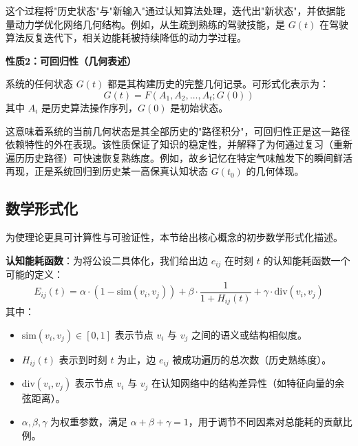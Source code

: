 \documentclass[12pt,a4paper]{article}
\begin{document}
这个过程将"历史状态"与"新输入"通过认知算法处理，迭代出"新状态"，并依据能量动力学优化网络几何结构。例如，从生疏到熟练的驾驶技能，是 $G(t)$ 在驾驶算法反复迭代下，相关边能耗被持续降低的动力学过程。

\textbf{性质2：可回归性（几何表述）}

系统的任何状态 $G(t)$ 都是其构建历史的完整几何记录。可形式化表示为：
\begin{equation}
G(t) = F(A_1, A_2, \ldots, A_t; G(0))
\end{equation}
其中 $A_i$ 是历史算法操作序列，$G(0)$ 是初始状态。

这意味着系统的当前几何状态是其全部历史的"路径积分"，可回归性正是这一路径依赖特性的外在表现。该性质保证了知识的稳定性，并解释了为何通过复习（重新遍历历史路径）可快速恢复熟练度。例如，故乡记忆在特定气味触发下的瞬间鲜活再现，正是系统回归到历史某一高保真认知状态 $G(t_0)$ 的几何体现。

\subsection{数学形式化}
为使理论更具可计算性与可验证性，本节给出核心概念的初步数学形式化描述。

\textbf{认知能耗函数}：为将公设二具体化，我们给出边 $e_{ij}$ 在时刻 $t$ 的认知能耗函数一个可能的定义：
\begin{equation}
E_{ij}(t) = \alpha \cdot (1 - \text{sim}(v_i, v_j)) + \beta \cdot \frac{1}{1 + H_{ij}(t)} + \gamma \cdot \text{div}(v_i, v_j)
\label{eq:energy_function}
\end{equation}
其中：
\begin{itemize}
    \item $\text{sim}(v_i, v_j) \in [0, 1]$ 表示节点 $v_i$ 与 $v_j$ 之间的语义或结构相似度。
    \item $H_{ij}(t)$ 表示到时刻 $t$ 为止，边 $e_{ij}$ 被成功遍历的总次数（历史熟练度）。
    \item $\text{div}(v_i, v_j)$ 表示节点 $v_i$ 与 $v_j$ 在认知网络中的结构差异性（如特征向量的余弦距离）。
    \item $\alpha, \beta, \gamma$ 为权重参数，满足 $\alpha + \beta + \gamma = 1$，用于调节不同因素对总能耗的贡献比例。
\end{itemize}
\end{document}
